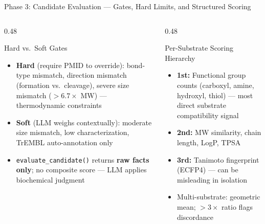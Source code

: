 \documentclass[aspectratio=169, 11pt]{beamer}
\begin{document}
\begin{frame}{Phase 3: Candidate Evaluation --- Gates, Hard Limits, and Structured Scoring}
\vspace{-8pt}
\begin{columns}[T]
\begin{column}{0.48\textwidth}
\begin{alertblock}{\small Hard vs.\ Soft Gates}
\vspace{-2pt}
\begin{itemize}\scriptsize
\setlength\itemsep{0pt}
\item \textbf{Hard} (require PMID to override): bond-type mismatch, direction mismatch (formation vs.\ cleavage), severe size mismatch ($>6.7\times$ MW) --- thermodynamic constraints
\item \textbf{Soft} (LLM weighs contextually): moderate size mismatch, low characterization, TrEMBL auto-annotation only
\item \texttt{evaluate\_candidate()} returns \textbf{raw facts only}; no composite score --- LLM applies biochemical judgment
\end{itemize}
\end{alertblock}
\end{column}
\begin{column}{0.48\textwidth}
\begin{exampleblock}{\small Per-Substrate Scoring Hierarchy}
\vspace{-2pt}
\begin{itemize}\scriptsize
\setlength\itemsep{0pt}
\item \textbf{1st:} Functional group counts (carboxyl, amine, hydroxyl, thiol) --- most direct substrate compatibility signal
\item \textbf{2nd:} MW similarity, chain length, LogP, TPSA
\item \textbf{3rd:} Tanimoto fingerprint (ECFP4) --- can be misleading in isolation
\item Multi-substrate: geometric mean; $>3\times$ ratio flags discordance
\end{itemize}
\end{exampleblock}
\end{column}
\end{columns}
\end{frame}
\end{document}

